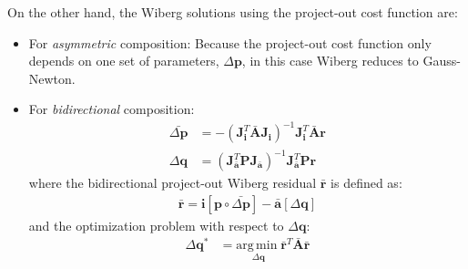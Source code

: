 On the other hand, the Wiberg solutions using the project-out cost function are:
\begin{itemize}
	\item For \emph{asymmetric} composition:
	Because the project-out cost function only depends on one set of parameters, $\Delta \mathbf{p}$, in this case Wiberg reduces to Gauss-Newton.

	\item For \emph{bidirectional} composition:
	\begin{equation}
	    \begin{aligned}
	    	\bar{\Delta \mathbf{p}} & = - \left( \mathbf{J}_\mathbf{i}^T \bar{\mathbf{A}} \mathbf{J}_\mathbf{i} \right)^{-1} \mathbf{J}_\mathbf{i}^T \bar{\mathbf{A}} \mathbf{r}
	    	\\
	        \Delta \mathbf{q} & = \left( \mathbf{J}_{\bar{\mathbf{a}}}^T \mathbf{P} \mathbf{J}_{\bar{\mathbf{a}}} \right)^{-1} \mathbf{J}_{\bar{\mathbf{a}}}^T \mathbf{P} \mathbf{r}
	    \label{eq:bidirectional_wiberg_po_solution}
	    \end{aligned}
	\end{equation}
	where the bidirectional project-out Wiberg residual $\bar{\mathbf{r}}$ is defined as:
	\begin{equation}
	    \begin{aligned}
	        \bar{\mathbf{r}} = \mathbf{i}[\mathbf{p} \circ \bar{\Delta\mathbf{p}}] - \bar{\mathbf{a}}[\Delta\mathbf{q}]
	    \label{eq:po_wiberg_residual}
	    \end{aligned}
	\end{equation}
	and the optimization problem with respect to $\Delta\mathbf{q}$: 
	\begin{equation}
	    \begin{aligned}
	        \Delta\mathbf{q}^* & = \underset{\Delta\mathbf{q}}{\mathrm{arg\,min\;}} \bar{\mathbf{r}}^T\bar{\mathbf{A}}\bar{\mathbf{r}}
	    \label{eq:bidirectional_wiberg_problem1}
	    \end{aligned}
	\end{equation}
\end{itemize}

